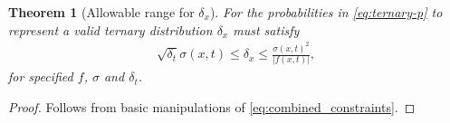 \documentclass[10pt,a4paper]{amsart}
\newtheorem{theorem}{Theorem}
\begin{document}
\begin{theorem}[Allowable range for $\delta_x$]
    For the probabilities in \eqref{eq:ternary-p} to represent a valid ternary distribution $\delta_x$ must satisfy
    \begin{align}\label{eq:allowable}
    \sqrt{\delta_t} \sigma(x,t) \leq \delta_x \leq \frac{\sigma(x,t)^2}{|f(x,t)|},
    \end{align}
     for specified $f$, $\sigma$ and $\delta_t$.
\end{theorem}

\begin{proof}
    Follows from basic manipulations of \eqref{eq:combined_constraints}.
\end{proof}
\end{document}
